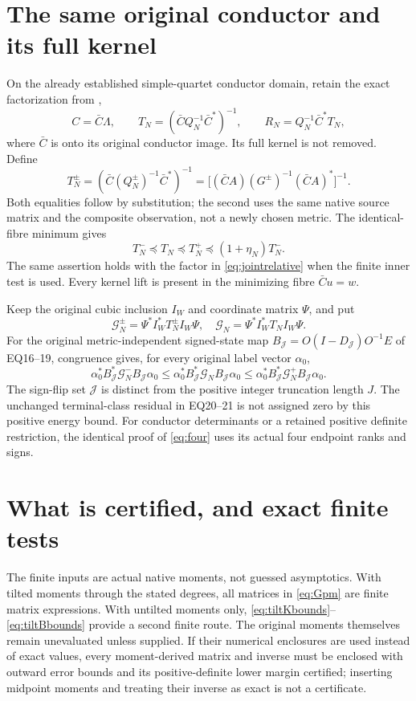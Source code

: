 \documentclass[11pt]{article}
\begin{document}
\section{The same original conductor and its full kernel}

On the already established simple-quartet conductor domain, retain
the exact factorization from \cite{EQ,TR},
\[
 C=\bar C\Lambda,
 \qquad T_N=(\bar C Q_N^{-1}\bar C^*)^{-1},
 \qquad R_N=Q_N^{-1}\bar C^*T_N,
\]
where $\bar C$ is onto its original conductor image.  Its full
kernel is not removed.  Define
\begin{equation}\label{eq:conductor}
 T_N^\pm=(\bar C(Q_N^\pm)^{-1}\bar C^*)^{-1}
 =\bigl[(\bar CA)(G^\pm)^{-1}(\bar CA)^*\bigr]^{-1}.
\end{equation}
Both equalities follow by substitution; the second uses the same
native source matrix and the composite observation, not a newly
chosen metric.  The identical-fibre minimum gives
\[
 T_N^-\preceq T_N\preceq T_N^+
 \preceq(1+\eta_N)T_N^-.
\]
The same assertion holds with the factor in \eqref{eq:jointrelative}
when the finite inner test is used.  Every kernel lift is present in
the minimizing fibre $\bar Cu=w$.

Keep the original cubic inclusion $I_W$ and coordinate matrix $\Psi$,
and put
\[
 \mathcal G_N^\pm=\Psi^*I_W^*T_N^\pm I_W\Psi,
 \quad\mathcal G_N=\Psi^*I_W^*T_NI_W\Psi.
\]
For the original metric-independent signed-state map
$B_{\mathcal J}=O(I-D_{\mathcal J})O^{-1}E$ of EQ16--19, congruence
gives, for every original label vector $\alpha_0$,
\begin{equation}\label{eq:defect}
 \alpha_0^*B_{\mathcal J}^*\mathcal G_N^-B_{\mathcal J}\alpha_0
 \le\alpha_0^*B_{\mathcal J}^*\mathcal G_NB_{\mathcal J}\alpha_0
 \le\alpha_0^*B_{\mathcal J}^*\mathcal G_N^+B_{\mathcal J}\alpha_0.
\end{equation}
The sign-flip set $\mathcal J$ is distinct from the positive integer
truncation length $J$.  The unchanged terminal-class residual in
EQ20--21 is not assigned zero by this positive energy bound.  For
conductor determinants or a retained positive definite restriction,
the identical proof of \eqref{eq:four} uses its actual four endpoint
ranks and signs.

\section{What is certified, and exact finite tests}

The finite inputs are actual native moments, not guessed asymptotics.
With tilted moments through the stated degrees, all matrices in
\eqref{eq:Gpm} are finite matrix expressions.  With untilted moments
only, \eqref{eq:tiltKbounds}--\eqref{eq:tiltBbounds} provide a second
finite route.  The original moments themselves remain unevaluated
unless supplied.  If their numerical enclosures are used instead of
exact values, every moment-derived matrix and inverse must be enclosed
with outward error bounds and its positive-definite lower margin
certified; inserting midpoint moments and treating their inverse as
exact is not a certificate.
\end{document}
